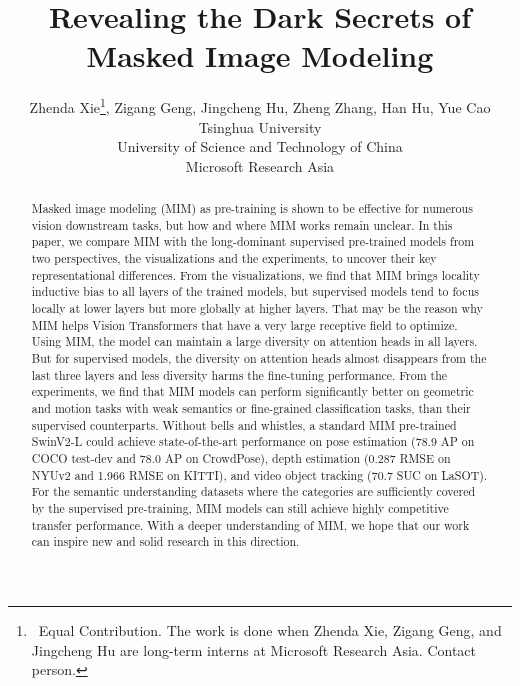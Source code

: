 \documentclass{article}
\title{Revealing the Dark Secrets of Masked Image Modeling}
\author{Zhenda Xie\thanks{~Equal Contribution. The work is done when Zhenda Xie, Zigang Geng, and Jingcheng Hu are long-term interns at Microsoft Research Asia.  Contact person. }\hspace{1.2mm}, Zigang Geng, Jingcheng Hu, Zheng Zhang, Han Hu,  Yue Cao \\
  Tsinghua University\\
  University of Science and Technology of China\\
  Microsoft Research Asia\\
}
\begin{document}
\maketitle


\begin{abstract}
  Masked image modeling (MIM) as pre-training is shown to be effective for numerous vision downstream tasks, but how and where MIM works remain unclear. In this paper, we compare MIM with the long-dominant supervised pre-trained models from two perspectives, the visualizations and the experiments, to uncover their key representational differences. From the visualizations, we find that MIM brings locality inductive bias to all layers of the trained models, but supervised models tend to focus locally at lower layers but more globally at higher layers. That may be the reason why MIM helps Vision Transformers that have a very large receptive field to optimize. Using MIM, the model can maintain a large diversity on attention heads in all layers. But for supervised models, the diversity on attention heads almost disappears from the last three layers and less diversity harms the fine-tuning performance. From the experiments, we find that MIM models can perform significantly better on geometric and motion tasks with weak semantics or fine-grained classification tasks, than their supervised counterparts. Without bells and whistles, a standard MIM pre-trained SwinV2-L could achieve state-of-the-art performance on pose estimation (78.9 AP on COCO test-dev and 78.0 AP on CrowdPose), depth estimation (0.287 RMSE on NYUv2 and 1.966 RMSE on KITTI), and video object tracking (70.7 SUC on LaSOT). For the semantic understanding datasets where the categories are sufficiently covered by the supervised pre-training, MIM models can still achieve highly competitive transfer performance. With a deeper understanding of MIM, we hope that our work can inspire new and solid research in this direction.
\end{abstract}
\end{document}
